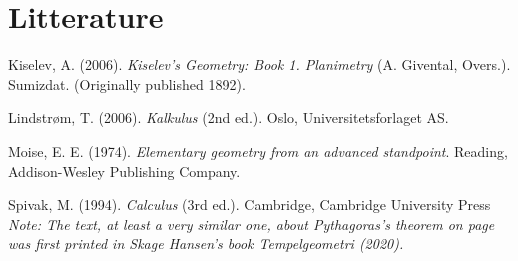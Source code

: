 



\chapter*{Litterature}
Kiselev, A. (2006). \textit{Kiselev's Geometry: Book 1. Planimetry} (A. Givental, Overs.). Sumizdat. (Originally published 1892).\vsk

Lindstrøm, T. (2006). \textit{Kalkulus} (2nd ed.). Oslo, Universitetsforlaget AS.\vsk

Moise, E. E. (1974). \textit{Elementary geometry from an advanced standpoint}. Reading, Addison-Wesley Publishing Company.\vsk

Spivak, M. (1994). \textit{Calculus} (3rd ed.). Cambridge, Cambridge University Press
\vfill
\textit{\footnotesize Note: The text, at least a very similar one, about Pythagoras's theorem on page \pageref{pytforklaringintro} was first printed in Skage Hansen's book \textit{Tempelgeometri} (2020).}
\newpage
